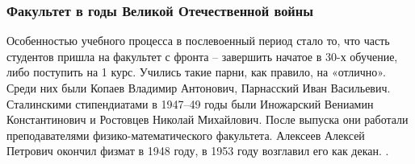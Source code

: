 \documentclass[pdf,hyperref={unicode}, aspectratio=43, serif,11pt]{beamer}
\begin{document}
\begin{frame}
\frametitle{Факультет в годы Великой Отечественной войны}
\tiny{

Особенностью учебного процесса в послевоенный период стало то, что часть студентов пришла на факультет с фронта – завершить начатое в 30-х обучение, либо поступить на 1 курс. Учились такие парни, как правило, на «отлично». Среди них были Копаев Владимир Антонович, Парнасский Иван Васильевич. Сталинскими стипендиатами в 1947–49 годы были Иножарский Вениамин Константинович и Ростовцев Николай Михайлович. После выпуска они работали преподавателями физико-математического факультета. Алексеев Алексей Петрович окончил физмат в 1948 году, в 1953 году возглавил его как декан.
.}
\begin{figure}[!h]
\centering
{}
\end{figure}

\end{frame}
\end{document}
